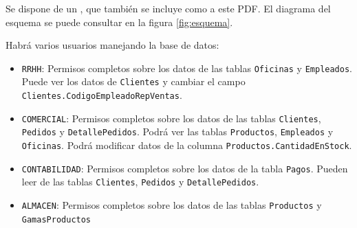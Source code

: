 Se dispone de un , que también se incluye como  a este PDF. El diagrama del esquema se puede consultar en la figura \ref{fig:esquema}.

Habrá varios usuarios manejando la base de datos:
\begin{itemize}
\item \texttt{RRHH}: Permisos completos sobre los datos de las tablas \texttt{Oficinas} y \texttt{Empleados}. Puede ver los datos de \texttt{Clientes} y cambiar el campo \texttt{Clientes.CodigoEmpleadoRepVentas}.  
\item \texttt{COMERCIAL}: Permisos completos sobre los datos de las tablas \texttt{Clientes}, \texttt{Pedidos} y \texttt{DetallePedidos}.  Podrá ver las tablas \texttt{Productos}, \texttt{Empleados} y \texttt{Oficinas}. Podrá modificar datos de la columna \texttt{Productos.CantidadEnStock}.
\item \texttt{CONTABILIDAD}: Permisos completos sobre los datos de la tabla \texttt{Pagos}. Pueden leer de las tablas \texttt{Clientes}, \texttt{Pedidos} y \texttt{DetallePedidos}.
\item \texttt{ALMACEN}: Permisos completos sobre los datos de las tablas \texttt{Productos} y \texttt{GamasProductos}
\end{itemize}

